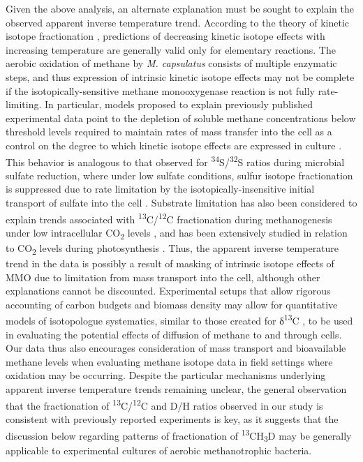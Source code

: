 Given the above analysis, an alternate explanation must be sought to
explain the observed apparent inverse temperature trend. According to
the theory of kinetic isotope fractionation \parencite[e.g.,][]{Bigeleisen_1949_JCP},
predictions of decreasing kinetic isotope effects with increasing
temperature are generally valid only for elementary reactions. The
aerobic oxidation of methane by \emph{M. capsulatus} consists of
multiple enzymatic steps, and thus expression of intrinsic kinetic
isotope effects may not be complete if the isotopically-sensitive
methane monooxygenase reaction is not fully rate-limiting. In
particular, models proposed to explain previously published experimental
data point to the depletion of soluble methane concentrations below
threshold levels required to maintain rates of mass transfer into the
cell as a control on the degree to which kinetic isotope effects are
expressed in culture \parencite{Nihous_2008_GCA,Nihous_2010_IEHS,Vavilin++_2015_IEHS}.
This behavior is analogous to that observed for
\textsuperscript{34}S/\textsuperscript{32}S ratios during microbial
sulfate reduction, where under low sulfate conditions, sulfur isotope
fractionation is suppressed due to rate limitation by the
isotopically-insensitive initial transport of sulfate into the cell
\parencite{Harrison+Thode_1958_TFS,Rees_1973_GCA}. Substrate limitation has also
been considered to explain trends associated with
\textsuperscript{13}C/\textsuperscript{12}C fractionation during
methanogenesis under low intracellular CO\textsubscript{2} levels \parencite[e.g.,][]{Valentine++_2004_GCA}, and has been extensively studied in relation to
CO\textsubscript{2} levels during photosynthesis \parencite[e.g.,][]{Farquhar++_1982_AJPP}. Thus, the apparent inverse temperature trend in the data is
possibly a result of masking of intrinsic isotope effects of MMO due to
limitation from mass transport into the cell, although other
explanations cannot be discounted. Experimental setups that allow
rigorous accounting of carbon budgets and biomass density may allow for
quantitative models of isotopologue systematics, similar to those
created for δ\textsuperscript{13}C \parencite{Templeton++_2006_GCA,Nihous_2008_GCA,Nihous_2010_IEHS}, to be used in evaluating the potential effects of
diffusion of methane to and through cells. Our data thus also encourages
consideration of mass transport and bioavailable methane levels when
evaluating methane isotope data in field settings where oxidation may be
occurring. Despite the particular mechanisms underlying apparent inverse
temperature trends remaining unclear, the general observation that the
fractionation of \textsuperscript{13}C/\textsuperscript{12}C and D/H
ratios observed in our study is consistent with previously reported
experiments is key, as it suggests that the discussion below regarding
patterns of fractionation of \textsuperscript{13}CH\textsubscript{3}D
may be generally applicable to experimental cultures of aerobic
methanotrophic bacteria.

